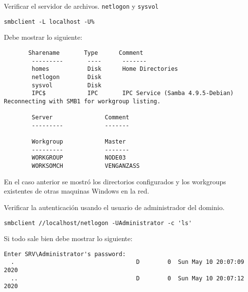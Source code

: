 \documentclass[../main.tex]{subfiles}
\begin{document}
\begin{enumerate}
    Verificar el servidor de archivos. \texttt{netlogon}
    y \texttt{sysvol}

    \begin{listing}[H]
  \begin{verbatim}
smbclient -L localhost -U%
\end{verbatim}
\end{listing}

    Debe mostrar lo siguiente:

    \begin{listing}[H]
  \begin{verbatim}
       Sharename       Type      Comment
        ---------       ----      -------
        homes           Disk      Home Directories
        netlogon        Disk
        sysvol          Disk
        IPC$            IPC       IPC Service (Samba 4.9.5-Debian)
Reconnecting with SMB1 for workgroup listing.

        Server               Comment
        ---------            -------

        Workgroup            Master
        ---------            -------
        WORKGROUP            NODE03
        WORKSOMCH            VENGANZASS
\end{verbatim}
\end{listing}

    	En el caso anterior se mostró los directorios configurados y 
    		los workgroups existentes de otras maquinas Windows en la red.
    	
    	Verificar la autenticación usando el usuario de administrador del dominio.
    	
    	\begin{listing}[H]
  \begin{verbatim}
smbclient //localhost/netlogon -UAdministrator -c 'ls'
\end{verbatim}
\end{listing}

    	Si todo sale bien debe mostrar lo siguiente:
    	
    	\begin{listing}[H]
  \begin{verbatim}
Enter SRV\Administrator's password:
  .                                   D        0  Sun May 10 20:07:09 2020
  ..                                  D        0  Sun May 10 20:07:12 2020


\end{verbatim}
\end{listing}
\end{enumerate}
\end{document}
